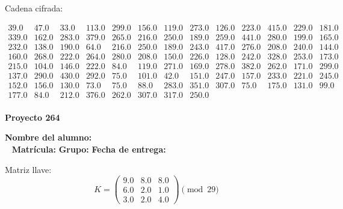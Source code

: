 \documentclass[12pt]{article}
\begin{document}
Cadena cifrada:
\begin{center}
$\begin{array}{lllllllllllll}
39.0 & 47.0 & 33.0 & 113.0 & 299.0 & 156.0 & 119.0 & 273.0 & 126.0 & 223.0 & 415.0 & 229.0 & 181.0\\
339.0 & 162.0 & 283.0 & 379.0 & 265.0 & 216.0 & 250.0 & 189.0 & 259.0 & 441.0 & 280.0 & 199.0 & 165.0\\
232.0 & 138.0 & 190.0 & 64.0 & 216.0 & 250.0 & 189.0 & 243.0 & 417.0 & 276.0 & 208.0 & 240.0 & 144.0\\
160.0 & 268.0 & 222.0 & 264.0 & 280.0 & 208.0 & 150.0 & 226.0 & 128.0 & 242.0 & 328.0 & 253.0 & 173.0\\
215.0 & 104.0 & 146.0 & 222.0 & 84.0 & 119.0 & 271.0 & 169.0 & 278.0 & 382.0 & 262.0 & 171.0 & 299.0\\
137.0 & 290.0 & 430.0 & 292.0 & 75.0 & 101.0 & 42.0 & 151.0 & 247.0 & 157.0 & 233.0 & 221.0 & 245.0\\
152.0 & 156.0 & 130.0 & 73.0 & 75.0 & 88.0 & 283.0 & 351.0 & 307.0 & 75.0 & 175.0 & 131.0 & 99.0\\
177.0 & 84.0 & 212.0 & 376.0 & 262.0 & 307.0 & 317.0 & 250.0\\
\end{array}$
\end{center}

\newpage


\textbf{Proyecto 264}

\textbf{Nombre del alumno:} \underline{\hspace{13cm}}\\\
\vspace{1cm}
\textbf{Matrícula:} \underline{\hspace{4cm}} \hspace{1cm}
\textbf{Grupo:} \underline{\hspace{2cm}}
\textbf{Fecha de entrega:} \underline{\hspace{2cm}}

\medskip

Matriz llave:
\[
K = \begin{pmatrix}
9.0 & 8.0 & 8.0\\
6.0 & 2.0 & 1.0\\
3.0 & 2.0 & 4.0
\end{pmatrix} \pmod{29}
\]
\end{document}
